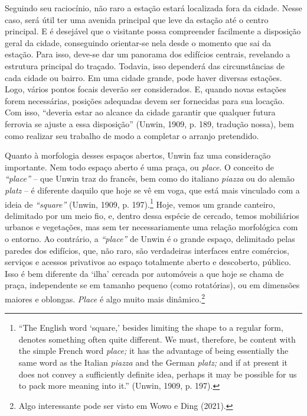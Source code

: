 \documentclass[12pt, a4paper]{book} %
\begin{document}
        Seguindo seu raciocínio, não raro a estação estará localizada fora da cidade. Nesse caso, será útil ter uma avenida principal que leve da estação até o centro principal. E é desejável que o visitante possa compreender facilmente a disposição geral da cidade, conseguindo orientar-se nela desde o momento que sai da estação. Para isso, deve-se dar um panorama dos edifícios centrais, revelando a estrutura principal do traçado. Todavia, isso dependerá das circunstâncias de cada cidade ou bairro. Em uma cidade grande, pode haver diversas estações. Logo, vários pontos focais deverão ser considerados. E, quando novas estações forem necessárias, posições adequadas devem ser fornecidas para sua locação. Com isso, ``deveria estar ao alcance da cidade garantir que qualquer futura ferrovia se ajuste a essa disposição'' (Unwin, 1909, p. 189, tradução nossa), bem como realizar seu trabalho de modo a completar o arranjo pretendido.

        Quanto à morfologia desses espaços abertos, Unwin faz uma consideração importante. Nem todo espaço aberto é uma praça, ou \textit{place}. O conceito de \textit{``place''}  – que Unwin traz do francês, bem como do italiano \textit{piazza} ou do alemão \textit{platz} – é diferente daquilo que hoje se vê em voga, que está mais vinculado com a ideia de \textit{``square''} (Unwin, 1909, p. 197).\footnote[61]{``The English word `square,' besides limiting the shape to a regular form, denotes something often quite different. We must, therefore, be content with the simple French word \textit{place;} it has the advantage of being essentially the same word as the Italian \textit{piazza} and the German \textit{platz;} and if at present it does not convey a sufficiently definite idea, perhaps it may be possible for us to pack more meaning into it.'' (Unwin, 1909, p. 197).} Hoje, vemos um grande canteiro, delimitado por um meio fio, e, dentro dessa espécie de cercado, temos mobiliários urbanos e vegetações, mas sem ter necessariamente uma relação morfológica com o entorno. Ao contrário, a \textit{``place''} de Unwin é o grande espaço, delimitado pelas paredes dos edifícios, que, não raro, são verdadeiras interfaces entre comércios, serviços e acessos privativos ao espaço totalmente aberto e descoberto, público. Isso é bem diferente da `ilha' cercada por automóveis a que hoje se chama de praça, independente se em tamanho pequeno (como rotatórias), ou em dimensões maiores e oblongas. \textit{Place} é algo muito mais dinâmico.\footnote[62]{Algo interessante pode ser visto em Wowo e Ding (2021).}
\end{document}
